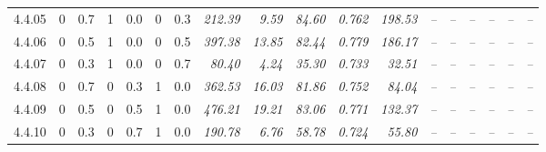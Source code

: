 \begin{table}[!t]
\begin{tabular}{@{}lllllllrrrrrrrrrrr@{}}
    4.4.05 & 0 & 0.7 & 1 & 0.0 & 0 & 0.3 & \textit{212.39} & \textit{9.59} & \textit{84.60} & \textit{0.762} & \textit{198.53} & \textit{--} & \textit{--} & \textit{--} & \textit{--} & \textit{--} & \textit{--} \\
    4.4.06 & 0 & 0.5 & 1 & 0.0 & 0 & 0.5 & \textit{397.38} & \textit{13.85} & \textit{82.44} & \textit{0.779} & \textit{186.17} & \textit{--} & \textit{--} & \textit{--} & \textit{--} & \textit{--} & \textit{--} \\
    4.4.07 & 0 & 0.3 & 1 & 0.0 & 0 & 0.7 & \textit{80.40} & \textit{4.24} & \textit{35.30} & \textit{0.733} & \textit{32.51} & \textit{--} & \textit{--} & \textit{--} & \textit{--} & \textit{--} & \textit{--} \\
    4.4.08 & 0 & 0.7 & 0 & 0.3 & 1 & 0.0 & \textit{362.53} & \textit{16.03} & \textit{81.86} & \textit{0.752} & \textit{84.04} & \textit{--} & \textit{--} & \textit{--} & \textit{--} & \textit{--} & \textit{--} \\
    4.4.09 & 0 & 0.5 & 0 & 0.5 & 1 & 0.0 & \textit{476.21} & \textit{19.21} & \textit{83.06} & \textit{0.771} & \textit{132.37} & \textit{--} & \textit{--} & \textit{--} & \textit{--} & \textit{--} & \textit{--} \\
    4.4.10 & 0 & 0.3 & 0 & 0.7 & 1 & 0.0 & \textit{190.78} & \textit{6.76} & \textit{58.78} & \textit{0.724} & \textit{55.80} & \textit{--} & \textit{--} & \textit{--} & \textit{--} & \textit{--} & \textit{--} \\
\hline
\end{tabular}
\end{table}